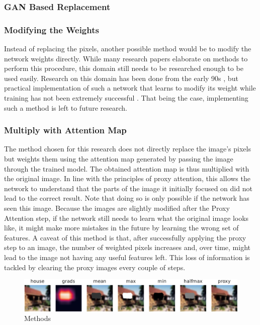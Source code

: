 \subsubsection{GAN Based Replacement}


\subsubsection{Modifying the Weights}
Instead of replacing the pixels, another possible method would be to modify the network weights directly. While many research papers elaborate on methods to perform this procedure, this domain still needs to be researched enough to be used easily. Research on this domain has been done from the early 90s \cite{schmidhuberSelfReferentialWeightMatrix1993}, but practical implementation of such a network that learns to modify its weight while training has not been extremely successful \cite{irieModernSelfReferentialWeight2022}. 
That being the case, implementing such a method is left to future research. 


\subsubsection{Multiply with Attention Map}
The method chosen for this research does not directly replace the image's pixels but weights them using the attention map generated by passing the image through the trained model. 
The obtained attention map is thus multiplied with the original image. In line with the principles of proxy attention, this allows the network to understand that the parts of the image it initially focused on did not lead to the correct result. Note that doing so is only possible if the network has seen this image. Because the images are slightly modified after the Proxy Attention step, if the network still needs to learn what the original image looks like, it might make more mistakes in the future by learning the wrong set of features.
A caveat of this method is that, after successfully applying the proxy step to an image, the number of weighted pixels increases and, over time, might lead to the image not having any useful features left. This loss of information is tackled by clearing the proxy images every couple of steps.

\begin{figure}[h]
    \centering
    \includegraphics[width=1\textwidth]{images/methods.pdf}
	\caption{Methods}
    \label{fig:methods}
\end{figure}

